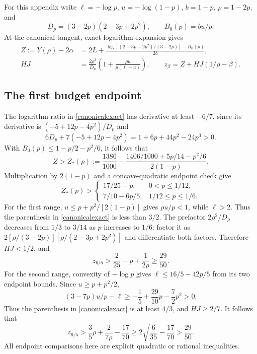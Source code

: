 \documentclass[11pt]{article}
\numberwithin{equation}{section}
\begin{document}
For this appendix write $\ell=-\log p$, $u=-\log(1-p)$, $b=1-p$, $\rho=1-2p$, and
\[
 D_p=(3-2p)(2-3p+2p^2),\qquad B_0(p)=bu/p.
\]
At the canonical tangent, exact logarithm expansion gives
\begin{align}
 Z:=Y(\rho)-2\alpha
 &=2L+\frac{\log[(2-3p+2p^2)/(3-2p)]-B_0(p)}{2b},\\
 HJ&=\frac{2\rho^2}{D_p}
       \left(1+\frac{\rho u}{p(\ell+u)}\right),
 \qquad z_\beta=Z+HJ(1/\rho-\beta).
 \label{canonicalexact}
\end{align}

\subsection*{The first budget endpoint}
The logarithm ratio in \eqref{canonicalexact} has derivative at least $-6/7$, since its derivative is $(-5+12p-4p^2)/D_p$ and
\[
 6D_p+7(-5+12p-4p^2)=1+6p+44p^2-24p^3>0.
\]
With $B_0(p)\le1-p/2-p^2/6$, it follows that
\[
 Z>Z_*(p):=\frac{1386}{1000}
 -\frac{1406/1000+5p/14-p^2/6}{2(1-p)}.
\]
Multiplication by $2(1-p)$ and a concave-quadratic endpoint check give
\[
 Z_*(p)>\begin{cases}
 17/25-p,&0<p\le1/12,\\
 7/10-6p/5,&1/12\le p\le1/6.
 \end{cases}
\]
For the first range, $u\le p+p^2/[2(1-p)]$ gives $\rho u/p<1$, while $\ell>2$. Thus the parenthesis in \eqref{canonicalexact} is less than $3/2$. The prefactor $2\rho^2/D_p$ decreases from $1/3$ to $3/14$ as $p$ increases to $1/6$: factor it as $2[\rho/(3-2p)][\rho/(2-3p+2p^2)]$ and differentiate both factors. Therefore $HJ<1/2$, and
\[
 z_{6/5}>\frac2{25}-p+\frac1{2\rho}\ge\frac{29}{50}.
\]
For the second range, convexity of $-\log p$ gives $\ell\le16/5-42p/5$ from its two endpoint bounds. Since $u\ge p+p^2/2$,
\[
 (3-7p)u/p-\ell\ge-\frac15+\frac{29}{10}p-\frac72p^2>0.
\]
Thus the parenthesis in \eqref{canonicalexact} is at least $4/3$, and $HJ\ge2/7$. It follows that
\[
 z_{6/5}>\frac35\rho+\frac2{7\rho}-\frac{17}{70}
 \ge2\sqrt{\frac6{35}}-\frac{17}{70}>\frac{29}{50}.
\]
All endpoint comparisons here are explicit quadratic or rational inequalities.
\end{document}
